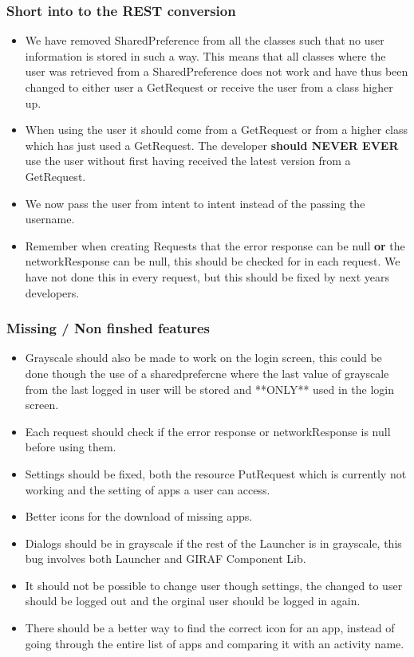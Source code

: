 \subsubsection{Short into to the REST conversion}
\begin{itemize}
  \item We have removed SharedPreference from all the classes such that no user
  information is stored in such a way. This means that all classes where the
  user was retrieved from a SharedPreference does not work and have thus been
  changed to either user a GetRequest or receive the user from a class higher
  up.
  \item When using the user it should come from a GetRequest or from a higher
  class which has just used a GetRequest. The developer \textbf{should NEVER
  EVER} use the user without first having received the latest version from a
  GetRequest. 
  \item We now pass the user from intent to intent instead of the passing the
  username.
  \item Remember when creating Requests that the error response can be null
  \textbf{or} the networkResponse can be null, this should be checked for in
  each request. We have not done this in every request, but this should be
  fixed by next years developers.
\end{itemize}

\subsubsection{Missing / Non finshed features}

\begin{itemize}
  \item Grayscale should also be made to work on the login screen, this could
  be done though the use of a sharedprefercne where the last value of grayscale
  from the last logged in user will be stored and **ONLY** used in the login
  screen.
  \item Each request should check if the error response or networkResponse is
  null before using them.
  \item Settings should be fixed, both the resource PutRequest which is
  currently not working and the setting of apps a user can access.
  \item Better icons for the download of missing apps.
  \item Dialogs should be in grayscale if the rest of the Launcher is in
  grayscale, this bug involves both Launcher and GIRAF Component Lib.
  \item It should not be possible to change user though settings, the changed
  to user should be logged out and the orginal user should be logged in again.
  \item There should be a better way to find the correct icon for an app,
  instead of going through the entire list of apps and comparing it with an
  activity name.
\end{itemize}

